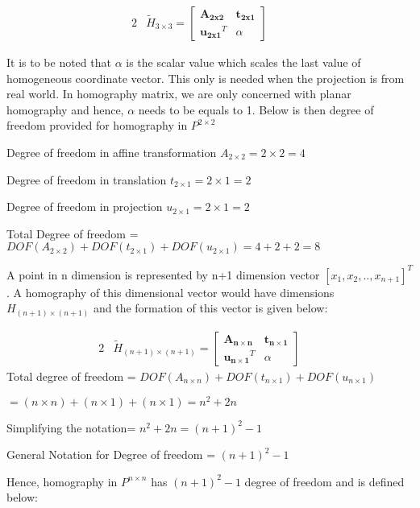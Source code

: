 \documentclass{article}
\begin{document}
\begin{alignat}{2}
&\tilde{H}_{3\times3} = \begin{bmatrix}
\mathbf{A_{2x2}} & \mathbf{t_{2x1}} \\
\mathbf{u_{2x1}}^{T} & \alpha
\end{bmatrix} & \quad   \label{eq:e1}
\end{alignat}

It is to be noted that \(\alpha\) is the scalar value which scales the last value of homogeneous coordinate vector. This only is needed when the projection is from real world. In homography matrix, we are only concerned with planar homography and hence, \(\alpha\) needs to be equals to 1. Below is then degree of freedom provided for homography in $P^{2\times2}$ \newline

Degree of freedom in affine transformation $A_{2\times2}= 2\times2=4$

Degree of freedom in translation $t_{2\times1}= 2\times1= 2$

Degree of freedom in projection $u_{2\times1}= 2\times1=2$

Total Degree of freedom = $DOF(A_{2\times2})+ DOF(t_{2\times1})+ DOF(u_{2\times1})= 4+2+2= 8$ \newline

A point in n dimension is represented by n+1 dimension vector $[x_{1},x_{2},.., x_{n+1}]^{T}$. A homography of this dimensional vector would have dimensions $H_{(n+1)\times (n+1)}$ and the formation of this vector is given below:

\begin{alignat}{2}
&\tilde{H}_{(n+1)\times(n+1)} = \begin{bmatrix}
\mathbf{A_{n\times n}} & \mathbf{t_{n\times 1}} \\
\mathbf{u_{n\times 1}}^{T} & \alpha
\end{bmatrix} & \quad   \label{eq:e1}
\end{alignat}
\newline
Total degree of freedom = $DOF(A_{n\times n})+DOF(t_{n\times1})+DOF(u_{n\times1})$

$= (n \times n) + (n \times 1) + (n \times 1)= n^{2}+2n$

Simplifying the notation= $n^{2}+2n= (n+1)^{2}-1$


General Notation for Degree of freedom = $(n+1)^{2}-1$ \newline

Hence, homography in $P^{n \times n}$ has $(n+1)^{2} -1$ degree of freedom and is defined below:
\end{document}
